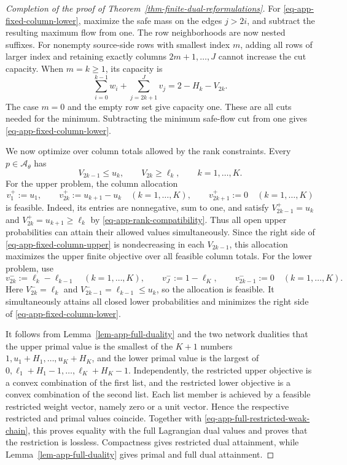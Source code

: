 \begin{proof}[Completion of the proof of Theorem~\ref{thm-finite-dual-reformulations}]
  For \eqref{eq-app-fixed-column-lower}, maximize the safe mass on the edges $j>2i$, and subtract the resulting maximum flow from one. The row neighborhoods are now nested suffixes. For nonempty source-side rows with smallest index $m$, adding all rows of larger index and retaining exactly columns $2m+1,\ldots,J$ cannot increase the cut capacity. When $m=k\ge1$, its capacity is
  \[
    \sum_{i=0}^{k-1}w_i+\sum_{j=2k+1}^Jv_j
    =2-H_k-V_{2k}.
  \]
  The case $m=0$ and the empty row set give capacity one. These are all cuts needed for the minimum. Subtracting the minimum safe-flow cut from one gives \eqref{eq-app-fixed-column-lower}.

  We now optimize over column totals allowed by the rank constraints. Every $p\in\mathcal A_\theta$ has
  \[
    V_{2k-1}\le u_k,\qquad V_{2k}\ge\ell_k,
    \qquad k=1,\ldots,K.
  \]
  For the upper problem, the column allocation
  \begin{equation}
    v_1^+:=u_1,\qquad
    v_{2k}^+:=u_{k+1}-u_k\quad(k=1,\ldots,K),\qquad
    v_{2k+1}^+:=0\quad(k=1,\ldots,K)
    \label{eq-app-upper-column-allocation}
  \end{equation}
  is feasible. Indeed, its entries are nonnegative, sum to one, and satisfy
  $V_{2k-1}^+=u_k$ and $V_{2k}^+=u_{k+1}\ge\ell_k$ by \eqref{eq-app-rank-compatibility}. Thus all open upper probabilities can attain their allowed values simultaneously. Since the right side of \eqref{eq-app-fixed-column-upper} is nondecreasing in each $V_{2k-1}$, this allocation maximizes the upper finite objective over all feasible column totals. For the lower problem, use
  \begin{equation}
    v_{2k}^-:=\ell_k-\ell_{k-1}\quad(k=1,\ldots,K),\qquad
    v_J^-:=1-\ell_K,\qquad
    v_{2k-1}^-:=0\quad(k=1,\ldots,K).
    \label{eq-app-lower-column-allocation}
  \end{equation}
  Here $V_{2k}^-=\ell_k$ and $V_{2k-1}^-=\ell_{k-1}\le u_k$, so the allocation is feasible. It simultaneously attains all closed lower probabilities and minimizes the right side of \eqref{eq-app-fixed-column-lower}.

  It follows from Lemma~\ref{lem-app-full-duality} and the two network dualities that the upper primal value is the smallest of the $K+1$ numbers $1,u_1+H_1,\ldots,u_K+H_K$, and the lower primal value is the largest of $0,\ell_1+H_1-1,\ldots,\ell_K+H_K-1$. Independently, the restricted upper objective is a convex combination of the first list, and the restricted lower objective is a convex combination of the second list. Each list member is achieved by a feasible restricted weight vector, namely zero or a unit vector. Hence the respective restricted and primal values coincide. Together with \eqref{eq-app-full-restricted-weak-chain}, this proves equality with the full Lagrangian dual values and proves that the restriction is lossless. Compactness gives restricted dual attainment, while Lemma~\ref{lem-app-full-duality} gives primal and full dual attainment.


\end{proof}
